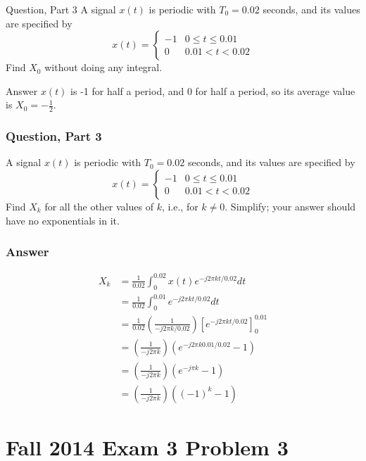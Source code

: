 \documentclass{beamer}
\begin{document}
\begin{frame}
  \begin{block}{Question, Part 3}
    A signal $x(t)$ is periodic with $T_0=0.02$ seconds, and its values
    are specified by
    \[
    x(t)=\left\{\begin{array}{ll}
    -1 & 0\le t\le 0.01\\
    0 & 0.01<t<0.02
    \end{array}\right.
    \]
    Find $X_0$ without doing any integral.
  \end{block}
  \begin{block}{Answer}
    $x(t)$ is -1 for half a period, and 0 for half a period, so its average value is $X_0=-\frac{1}{2}$.
  \end{block}
\end{frame}

\begin{frame}
  \frametitle{Question, Part 3}
    A signal $x(t)$ is periodic with $T_0=0.02$ seconds, and its values
    are specified by
    \[
    x(t)=\left\{\begin{array}{ll}
    -1 & 0\le t\le 0.01\\
    0 & 0.01<t<0.02
    \end{array}\right.
    \]
    Find $X_k$ for all the other values of $k$, i.e., for $k\ne 0$.
    Simplify; your answer should have no exponentials in it.
\end{frame}


\begin{frame}
  \frametitle{Answer}
  \begin{align*}
    X_k &= \frac{1}{0.02}\int_0^{0.02} x(t) e^{-j2\pi kt/0.02}dt\\
    &= \frac{1}{0.02}\int_0^{0.01} e^{-j2\pi kt/0.02}dt\\
    &= \frac{1}{0.02}\left(\frac{1}{-j2\pi k/0.02}\right)\left[e^{-j2\pi kt/0.02}\right]_0^{0.01}\\
    &= \left(\frac{1}{-j2\pi k}\right)\left(e^{-j2\pi k0.01/0.02}-1\right)\\
    &= \left(\frac{1}{-j2\pi k}\right)\left(e^{-j\pi k}-1\right)\\
    &= \left(\frac{1}{-j2\pi k}\right)\left((-1)^k-1\right)
  \end{align*}
\end{frame}

\section[14x3p3]{Fall 2014 Exam 3 Problem 3}
\setcounter{subsection}{1}
\end{document}
